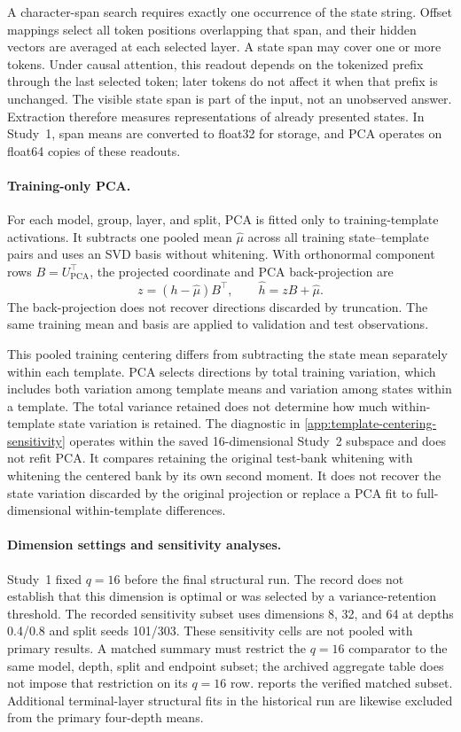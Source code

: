 A character-span search requires exactly one occurrence of
the state string.
Offset mappings select all token positions overlapping that
span, and their hidden vectors are averaged at each selected
layer.
A state span may cover one or more tokens.
Under causal attention, this readout depends on the tokenized
prefix through the last selected token; later tokens do not
affect it when that prefix is unchanged.
The visible state span is part of the input, not an unobserved
answer.
Extraction therefore measures representations of already
presented states.
In Study~1, span means are converted to float32 for storage,
and PCA operates on float64 copies of these readouts.

\paragraph{Training-only PCA.}
For each model, group, layer, and split, PCA is fitted only
to training-template activations.
It subtracts one pooled mean $\hat\mu$ across all training
state--template pairs and uses an SVD basis without whitening.
With orthonormal component rows
$B=U_{\mathrm{PCA}}^\top$, the projected coordinate and
PCA back-projection are
\[
 z=(h-\hat\mu)B^\top,
 \qquad
 \widehat h=zB+\hat\mu.
\]
The back-projection does not recover directions discarded
by truncation.
The same training mean and basis are applied to validation
and test observations.

This pooled training centering differs from subtracting the
state mean separately within each template.
PCA selects directions by total training variation, which
includes both variation among template means and variation
among states within a template.
The total variance retained does not determine how much
within-template state variation is retained.
The diagnostic in \cref{app:template-centering-sensitivity}
operates within the saved 16-dimensional Study~2 subspace
and does not refit PCA.
It compares retaining the original test-bank whitening with
whitening the centered bank by its own second moment.
It does not recover the state variation discarded by the
original projection or replace a PCA fit to full-dimensional
within-template differences.

\paragraph{Dimension settings and sensitivity analyses.}
Study~1 fixed $q=16$ before the final structural run.
The record does not establish that this dimension is optimal
or was selected by a variance-retention threshold.
The recorded sensitivity subset uses dimensions 8, 32,
and 64 at depths 0.4/0.8 and split seeds 101/303.
These sensitivity cells are not pooled with primary results.
A matched summary must restrict the $q=16$ comparator to
the same model, depth, split and endpoint subset;
the archived aggregate table does not impose that restriction
on its $q=16$ row.
 reports the verified matched
subset.
Additional terminal-layer structural fits in the historical
run are likewise excluded from the primary four-depth means.

